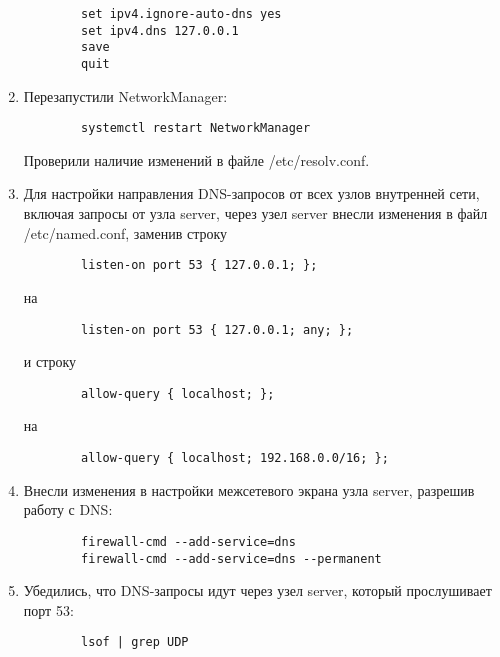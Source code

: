 \begin{enumerate}
\begin{verbatim}
        set ipv4.ignore-auto-dns yes
        set ipv4.dns 127.0.0.1
        save
        quit
        \end{verbatim}
    \item Перезапустили NetworkManager:
        \begin{verbatim}
        systemctl restart NetworkManager
        \end{verbatim}
    Проверили наличие изменений в файле /etc/resolv.conf.
    \item Для настройки направления DNS-запросов от всех узлов внутренней сети, включая запросы от узла server, через узел server внесли изменения в файл /etc/named.conf, заменив строку
        \begin{verbatim}
        listen-on port 53 { 127.0.0.1; };
        \end{verbatim}
    на
        \begin{verbatim}
        listen-on port 53 { 127.0.0.1; any; };
        \end{verbatim}
    и строку
        \begin{verbatim}
        allow-query { localhost; };
        \end{verbatim}
    на
        \begin{verbatim}
        allow-query { localhost; 192.168.0.0/16; };
        \end{verbatim}
    \item Внесли изменения в настройки межсетевого экрана узла server, разрешив работу с DNS:
        \begin{verbatim}
        firewall-cmd --add-service=dns
        firewall-cmd --add-service=dns --permanent
        \end{verbatim}
    \item Убедились, что DNS-запросы идут через узел server, который прослушивает порт 53:
        \begin{verbatim}
        lsof | grep UDP
        \end{verbatim}
\end{enumerate}

